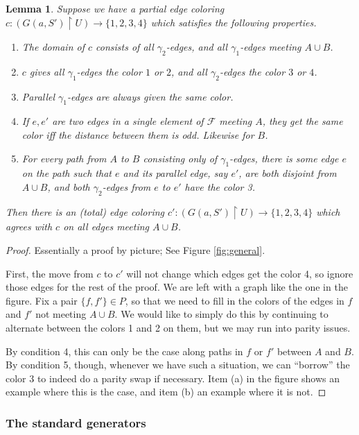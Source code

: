 \documentclass[10pt,a4paper]{article}
\newcommand{\0}{\varnothing}
\newcommand{\F}{\mathcal{F}}
\newcommand{\res}{\upharpoonright}
\newtheorem{lemma}{Lemma}
\begin{document}
\begin{lemma}\label{lem:general}
Suppose we have a partial edge coloring $c:(G(a,S') \res U) \rightarrow \{1,2,3,4\}$ which satisfies the following properties. 
\begin{enumerate}
    \item The domain of $c$ consists of all $\gamma_2$-edges, and all $\gamma_1$-edges meeting $A \cup B$.
    \item $c$ gives all $\gamma_1$-edges the color $1$ or $2$, and all $\gamma_2$-edges the color $3$ or $4$.
    \item Parallel $\gamma_1$-edges are always given the same color.
    \item If $e,e'$ are two edges in a single element of $\F$ meeting $A$, they get the same color iff the distance between them is odd. Likewise for $B$.
    \item For every path from $A$ to $B$ consisting only of $\gamma_1$-edges, there is some edge $e$ on the path such that $e$ and its parallel edge, say $e'$, are both disjoint from $A \cup B$, and both $\gamma_2$-edges from $e$ to $e'$ have the color 3.  
\end{enumerate}
Then there is an (total) edge coloring $c':(G(a,S') \res U) \rightarrow \{1,2,3,4\}$ which agrees with $c$ on all edges meeting $A \cup B$.
\end{lemma}

\begin{proof}
Essentially a proof by picture; See Figure \ref{fig:general}. 

First, the move from $c$ to $c'$ will not change which edges get the color 4, so ignore those edges for the rest of the proof. We are left with a graph like the one in the figure. Fix a pair $\{f,f'\} \in P$, so that we need to fill in the colors of the edges in $f$ and $f'$ not meeting $A \cup B$. We would like to simply do this by continuing to alternate between the colors 1 and 2 on them, but we may run into parity issues.

By condition 4, this can only be the case along paths in $f$ or $f'$ between $A$ and $B$. By condition 5, though, whenever we have such a situation, we can ``borrow'' the color 3 to indeed do a parity swap if necessary. Item (a) in the figure shows an example where this is the case, and item (b) an example where it is not. 
\end{proof}

\subsubsection{The standard generators}
\end{document}
